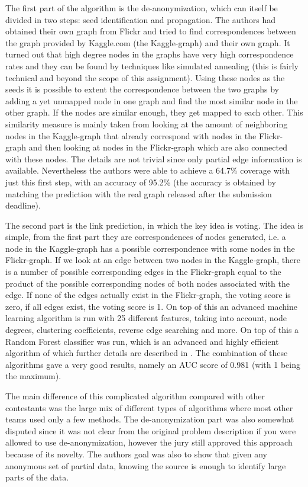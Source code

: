 \documentclass[a4]{article}
\begin{document}
The first part of the algorithm is the de-anonymization, which can itself be divided in two steps: seed identification and propagation. The authors had obtained their own graph from Flickr and tried to find correspondences between the graph provided by Kaggle.com (the Kaggle-graph) and their own graph. It turned out that high degree nodes in the graphs have very high correspondence rates and they can be found by techniques like simulated annealing (this is fairly technical and beyond the scope of this assignment). Using these nodes as the seeds it is possible to extent the correspondence between the two graphs by adding a yet unmapped node in one graph and find the most similar node in the other graph. If the nodes are similar enough, they get mapped to each other. This similarity measure is mainly taken from looking at the amount of neighboring nodes in the Kaggle-graph that already correspond with nodes in the Flickr-graph and then looking at nodes in the Flickr-graph which are also connected with these nodes. The details are not trivial since only partial edge information is available. Nevertheless the authors were able to achieve a 64.7\% coverage with just this first step, with an accuracy of 95.2\% (the accuracy is obtained by matching the prediction with the real graph released after the submission deadline).

The second part is the link prediction, in which the key idea is voting. The idea is simple, from the first part they are correspondences of nodes generated, i.e. a node in the Kaggle-graph has a possible correspondence with some nodes in the Flickr-graph. If we look at an edge between two nodes in the Kaggle-graph, there is a number of possible corresponding edges in the Flickr-graph equal to the product of the possible corresponding nodes of both nodes associated with the edge. If none of the edges actually exist in the Flickr-graph, the voting score is zero, if all edges exist, the voting score is 1. On top of this an advanced machine learning algorithm is run with 25 different features, taking into account, node degrees, clustering coefficients, reverse edge searching and more. On top of this a Random Forest classifier was run, which is an advanced and highly efficient algorithm of which further details are described in \cite{randomforest}. The combination of these algorithms gave a very good results, namely an AUC score of 0.981 (with 1 being the maximum).

The main difference of this complicated algorithm compared with other contestants was the large mix of different types of algorithms where most other teams used only a few methods. The de-anonymization part was also somewhat disputed since it was not clear from the original problem description if you were allowed to use de-anonymization, however the jury still approved this approach because of its novelty. The authors goal was also to show that given any anonymous set of partial data, knowing the source is enough to identify large parts of the data.
\end{document}

